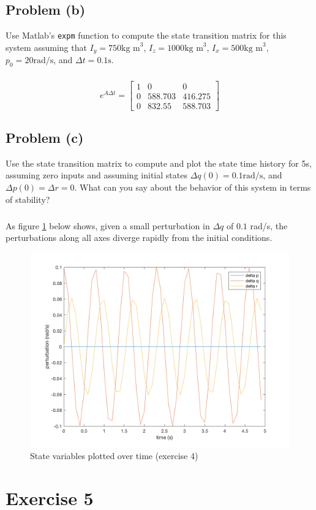 \documentclass[11pt]{article}
\begin{document}
\subsection*{Problem (b)}
Use Matlab's \texttt{expm} function to compute the state transition matrix for this system assuming that $I_y=750\text{kg m}^3$, $I_z=1000\text{kg m}^3$, $I_x=500 \text{kg m}^3$, $p_0 = 20 \text{rad/s}$, and $\Delta t=0.1\text{s}$.

\subparagraph*{}
\begin{equation*}
	e^{A\Delta t} = \begin{bmatrix}
					1 & 0 & 0 \\
					0 & 588.703 & 416.275 \\
					0 & 832.55 & 588.703
					\end{bmatrix}
\end{equation*}

\subsection*{Problem (c)}
Use the state transition matrix to compute and plot the state time history for 5s, assuming zero inputs and assuming initial states $\Delta q(0) = 0.1\text{rad/s}$, and $\Delta p(0) = \Delta r = 0$. What can you say about the behavior of this system in terms of stability?

\subparagraph*{}
As figure \ref{fig:prob4} below shows, given a small perturbation in $\Delta q$ of $0.1$ rad/s, the perturbations along all axes diverge rapidly from the initial conditions.

\begin{figure}
	\centerline{\includegraphics[width=0.67\linewidth]{prob_4_fig.png}}
	\caption{State variables plotted over time (exercise 4)}
	\label{fig:prob4}
\end{figure}

\section*{Exercise 5}
\end{document}
